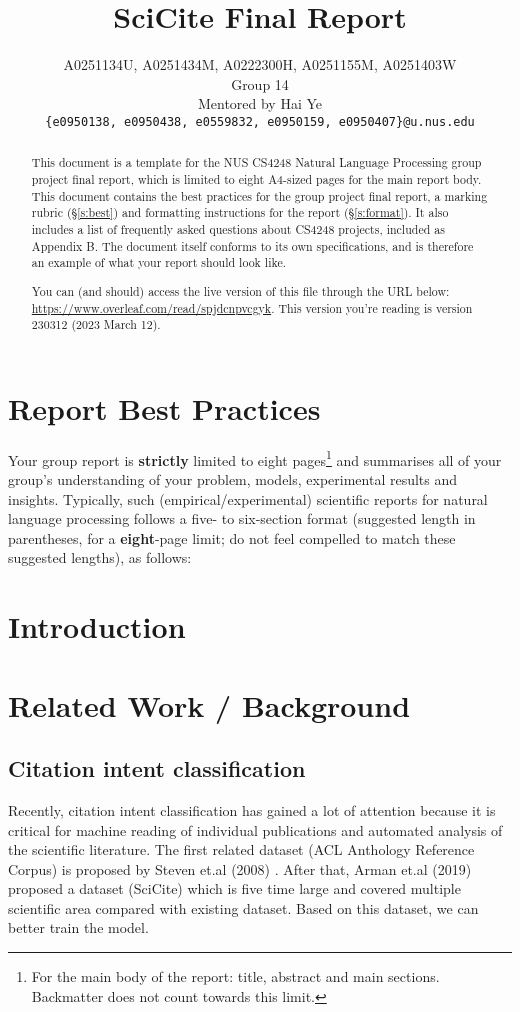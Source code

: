 \documentclass[11pt]{article}
\title{SciCite Final Report}
\author{A0251134U, A0251434M, A0222300H, A0251155M, A0251403W \\
  Group 14 \\
  Mentored by Hai Ye \\
  \texttt{\{e0950138, e0950438, e0559832, e0950159, e0950407\}@u.nus.edu}}
\begin{document}
\maketitle
\begin{abstract}
This document is a template for the NUS CS4248 Natural Language Processing group project final report, which is limited to eight A4-sized pages for the main report body. This document contains the best practices for the group project final report, a marking rubric (\S\ref{s:best}) and formatting instructions for the report (\S\ref{s:format}).  It also includes a list of frequently asked questions about CS4248 projects, included as Appendix B. 
The document itself conforms to its own specifications, and is therefore an example of what your report should look like.  

You can (and should) access the live version of this file through the URL below:
\url{https://www.overleaf.com/read/spjdcnpvcgyk}.  This version you're reading is version 230312 (2023 March 12).
\end{abstract}

\section{Report Best Practices}
\label{s:best}

Your group report is {\bf strictly} limited to eight pages\footnote{For the main body of the report: title, abstract and main sections. Backmatter does not count towards this limit.} and summarises all of your group's understanding of your problem, models, experimental results and insights.  Typically, such (empirical/experimental) scientific reports for natural language processing follows a five- to six-section format ({}suggested length in parentheses, for a {\bf eight}-page limit; do not feel compelled to match these suggested lengths), as follows:

\section{\bf Introduction}
\section{\bf Related Work / Background}
\subsection{Citation intent classification}
Recently, citation intent classification has gained a lot of attention because it is critical for machine reading of individual publications and automated analysis of the scientific literature. The first related dataset (ACL Anthology Reference Corpus) is proposed by Steven et.al (2008) \cite{220fe80c8f374e458d79d387be245c5f}. After that, Arman et.al (2019) \cite{cohan2019structural} proposed a dataset (SciCite) which is five time large and covered multiple scientific area compared with existing dataset. Based on this dataset, we can better train the model.
\end{document}
